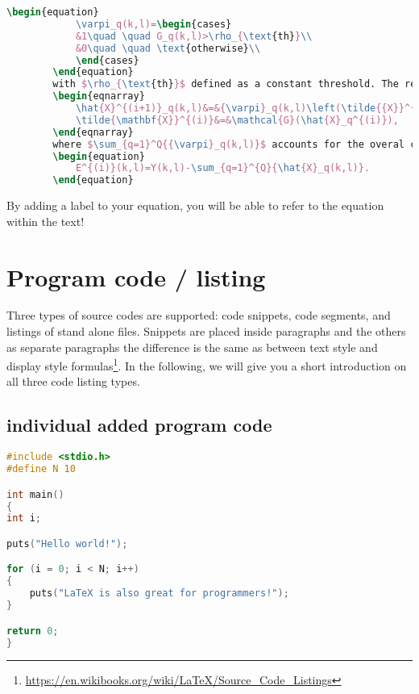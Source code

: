 	\begin{mdframed}
		\begin{lstlisting}[language = TeX, caption={The math example}, linewidth=150mm]
		\begin{equation}
			\varpi_q(k,l)=\begin{cases}
			&1\quad \quad G_q(k,l)>\rho_{\text{th}}\\
			&0\quad \quad \text{otherwise}\\
			\end{cases}
		\end{equation}
		with $\rho_{\text{th}}$ defined as a constant threshold. The remixing error spreading is performed as follows:
		\begin{eqnarray}
			\hat{X}^{(i+1)}_q(k,l)&=&{\varpi}_q(k,l)\left(\tilde{{X}}^{(i)}_q(k,l)+\frac{E^{(i)}(k,l)}{\sum_{q=1}^Q{{\varpi}_q(k,l)}}\right)\nonumber\\
			\tilde{\mathbf{X}}^{(i)}&=&\mathcal{G}(\hat{X}_q^{(i)}),
		\end{eqnarray}
		where $\sum_{q=1}^Q{{\varpi}_q(k,l)}$ accounts for the overal contributions of sources in time frequency error distribution and the remixing error $E^{(i)}(k,l)$ is defined as 
		\begin{equation}
			E^{(i)}(k,l)=Y(k,l)-\sum_{q=1}^{Q}{\hat{X}_q(k,l)}.
		\end{equation}
		\end{lstlisting}
		By adding a label to your equation, you will be able to refer to the equation within the text!
	\end{mdframed}

\section{Program code / listing}
Three types of source codes are supported: code snippets, code segments, and
listings of stand alone files. Snippets are placed inside paragraphs and the others as
separate paragraphs the difference is the same as between text style and display
style formulas\footnote{\url{https://en.wikibooks.org/wiki/LaTeX/Source_Code_Listings}}. In the following, we will give you a short introduction on all three code listing types.

\subsection{individual added program code}
\begin{lstlisting}[language = C,caption = {Single code}]
#include <stdio.h>
#define N 10

int main()
{
int i;

puts("Hello world!");

for (i = 0; i < N; i++)
{
	puts("LaTeX is also great for programmers!");
}

return 0;
}
\end{lstlisting}

